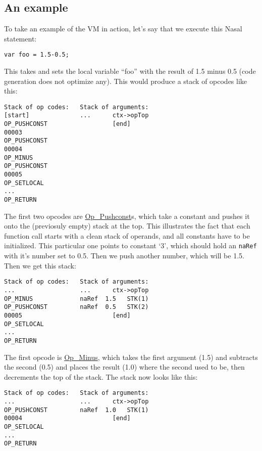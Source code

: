 \documentclass{article}
\newcommand{\todo}[1]{}
\newcommand{\type}[1]{\textcolor{type}{\tt #1}}
\newcommand{\Op} [1]{\hyperref[op:#1]{\textcolor{opcode}{\sc Op\_#1}}}
\begin{document}
\subsection{An example}
To take an example of the VM in action, let's say that we execute this Nasal statement:

\begin{lstlisting}[language=nasal]
var foo = 1.5-0.5;
\end{lstlisting}

This takes and sets the local variable ``foo'' with the result of 1.5 minus 0.5 (code generation does not optimize any).  This would produce a stack of opcodes like this:

\todo{all these examples are neat and important, but tedious and error-prone to create: we should automate the creation of them using our Nasal/LaTex hacks, so that we can dump the stacks to the console and even turn them into nice "stack tables" to be used here}

\begin{verbatim}
Stack of op codes:   Stack of arguments:
[start]              ...      ctx->opTop
OP_PUSHCONST                  [end]
00003
OP_PUSHCONST
00004
OP_MINUS
OP_PUSHCONST
00005
OP_SETLOCAL
...
OP_RETURN
\end{verbatim}

The first two opcodes are \Op{Pushconst}s, which take a constant and pushes it onto the (previosuly empty) stack at the top. This illustrates the fact that each function call starts with a clean stack of operands, and all constants have to be initialized. This particular one points to constant `3', which should hold an \type{naRef} with it's number set to 0.5.  Then we push another number, which will be 1.5.  Then we get this stack:

\begin{verbatim}
Stack of op codes:   Stack of arguments:
...                  ...      ctx->opTop
OP_MINUS             naRef  1.5   STK(1)
OP_PUSHCONST         naRef  0.5   STK(2)
00005                         [end]
OP_SETLOCAL
...
OP_RETURN
\end{verbatim}

The first opcode is \Op{Minus}, which takes the first argument (1.5) and subtracts the second (0.5) and places the result (1.0) where the second used to be, then decrements the top of the stack.  The stack now looks like this:

\begin{verbatim}
Stack of op codes:   Stack of arguments:
...                  ...      ctx->opTop
OP_PUSHCONST         naRef  1.0   STK(1)
00004                         [end]
OP_SETLOCAL
...
OP_RETURN
\end{verbatim}
\end{document}

